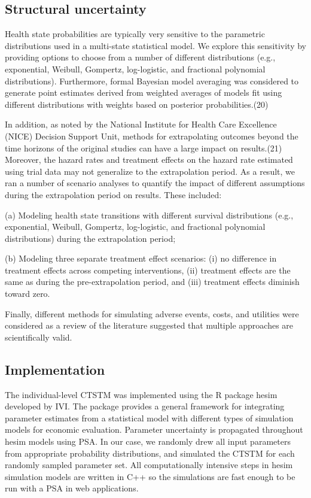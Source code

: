 \documentclass[11pt,final,fleqn]{article}\usepackage[]{graphicx}\usepackage[]{color}
\theoremstyle{plain}
\newcommand{\pkg}[1]{{\fontseries{b}\selectfont #1}}
\begin{document}
{\subsection{Structural uncertainty}

Health state probabilities are typically very sensitive to the parametric distributions used in a multi-state statistical model. We explore this sensitivity by providing options to choose from a number of different distributions (e.g., exponential, Weibull, Gompertz, log-logistic, and fractional polynomial distributions). Furthermore, formal Bayesian model averaging was considered to generate point estimates derived from weighted averages of models fit using different distributions with weights based on posterior probabilities.(20)

In addition, as noted by the National Institute for Health Care Excellence (NICE) Decision Support Unit, methods for extrapolating outcomes beyond the time horizons of the original studies can have a large impact on results.(21) Moreover, the hazard rates and treatment effects on the hazard rate estimated using trial data may not generalize to the extrapolation period. As a result, we ran a number of scenario analyses to quantify the impact of different assumptions during the extrapolation period on results. These included: 

(a) Modeling health state transitions with different survival distributions (e.g., exponential, Weibull, Gompertz, log-logistic, and fractional polynomial distributions) during the extrapolation period;

(b) Modeling three separate treatment effect scenarios: (i) no difference in treatment effects across competing interventions, (ii) treatment effects are the same as during the pre-extrapolation period, and (iii) treatment effects diminish toward zero. 

Finally, different methods for simulating adverse events, costs, and utilities were considered as a review of the literature suggested that multiple approaches are scientifically valid.

\subsection{Implementation} 

The individual-level CTSTM was implemented using the R package \pkg{hesim} developed by IVI. The package provides a general framework for integrating parameter estimates from a statistical model with different types of simulation models for economic evaluation. Parameter uncertainty is propagated throughout \pkg{hesim} models using PSA. In our case, we randomly drew all input parameters from appropriate probability distributions, and simulated the CTSTM for each randomly sampled parameter set. All computationally intensive steps in \pkg{hesim} simulation models are written in C++ so the simulations are fast enough to be run with a PSA in web applications. 

}
\end{document}
